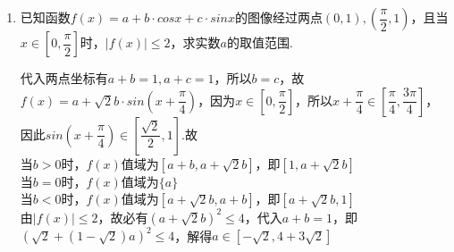 \begin{enumerate}
\begin{enumerate}
        \item 已知函数$f(x) = a + b \cdot cosx + c \cdot sinx$的图像经过两点$(0, 1), \left(\dfrac{\pi}{2}, 1\right)$，且当$x \in [0, \dfrac{\pi}{2}]$时，$|f(x)| \leq 2$，求实数$a$的取值范围.
        \begin{jieda}
            代入两点坐标有$a + b = 1, a + c = 1$，所以$b = c$，故$f(x) = a + \sqrt{2}b \cdot sin(x + \dfrac{\pi}{4})$，因为$x \in \left[0, \dfrac{\pi}{2}\right]$，所以$x + \dfrac{\pi}{4} \in [\dfrac{\pi}{4}, \dfrac{3\pi}{4}]$，因此$sin(x + \dfrac{\pi}{4}) \in [\dfrac{\sqrt{2}}{2}, 1]$.故\\
            当$b > 0$时，$f(x)$值域为$[a+b, a + \sqrt{2}b]$，即$[1, a+\sqrt{2}b]$ \\
            当$b = 0$时，$f(x)$值域为$\{a\}$ \\
            当$b < 0$时，$f(x)$值域为$[a + \sqrt{2}b, a+b]$，即$[a+\sqrt{2}b, 1]$ \\
            由$|f(x)| \leq 2$，故必有$(a+\sqrt{2}b)^2 \leq 4$，代入$a+b = 1$，即$(\sqrt{2} + (1 - \sqrt{2})a)^2 \leq 4$，解得$a \in [-\sqrt{2}, 4 + 3\sqrt{2}]$
        \end{jieda}
    \end{enumerate}


\end{enumerate}
